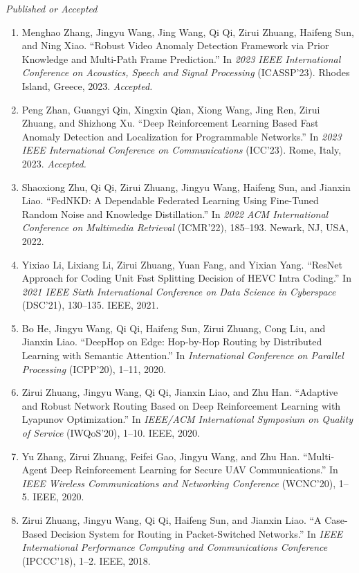 \documentclass[letterpaper,11pt]{article}
\newcommand{\contentlength}{5.25in} %
\begin{document}
\begin{tcolorbox}[flush right,breakable,colback=white,colframe=white,width=\contentlength]
		\textit{Published or Accepted}
		\begin{enumerate}[itemsep=0mm]
			\item Menghao Zhang, Jingyu Wang, Jing Wang, Qi Qi, Zirui Zhuang, Haifeng Sun, and Ning Xiao. “Robust Video Anomaly Detection Framework via Prior Knowledge and Multi-Path Frame Prediction.” In \textit{2023 IEEE International Conference on Acoustics, Speech and Signal Processing} (ICASSP’23). Rhodes Island, Greece, 2023. \textit{Accepted.}
			\item Peng Zhan, Guangyi Qin, Xingxin Qian, Xiong Wang, Jing Ren, Zirui Zhuang, and Shizhong Xu. “Deep Reinforcement Learning Based Fast Anomaly Detection and Localization for Programmable Networks.” In \textit{2023 IEEE International Conference on Communications} (ICC’23). Rome, Italy, 2023. \textit{Accepted.}
			\item Shaoxiong Zhu, Qi Qi, Zirui Zhuang, Jingyu Wang, Haifeng Sun, and Jianxin Liao. “FedNKD: A Dependable Federated Learning Using Fine-Tuned Random Noise and Knowledge Distillation.” In \textit{2022 ACM International Conference on Multimedia Retrieval} (ICMR'22), 185–193. Newark, NJ, USA, 2022.
			\item Yixiao Li, Lixiang Li, Zirui Zhuang, Yuan Fang, and Yixian Yang. “ResNet Approach for Coding Unit Fast Splitting Decision of HEVC Intra Coding.” In \textit{2021 IEEE Sixth International Conference on Data Science in Cyberspace} (DSC'21), 130–135. IEEE, 2021.
			\item Bo He, Jingyu Wang, Qi Qi, Haifeng Sun, Zirui Zhuang, Cong Liu, and Jianxin Liao. “DeepHop on Edge: Hop-by-Hop Routing by Distributed Learning with Semantic Attention.” In \textit{International Conference on Parallel Processing} (ICPP'20), 1–11, 2020.
			\item Zirui Zhuang, Jingyu Wang, Qi Qi, Jianxin Liao, and Zhu Han. “Adaptive and Robust Network Routing Based on Deep Reinforcement Learning with Lyapunov Optimization.” In \textit{IEEE/ACM International Symposium on Quality of Service} (IWQoS'20), 1–10. IEEE, 2020.
			\item Yu Zhang, Zirui Zhuang, Feifei Gao, Jingyu Wang, and Zhu Han. “Multi-Agent Deep Reinforcement Learning for Secure UAV Communications.” In \textit{IEEE Wireless Communications and Networking Conference} (WCNC'20), 1–5. IEEE, 2020.
			\item Zirui Zhuang, Jingyu Wang, Qi Qi, Haifeng Sun, and Jianxin Liao. “A Case-Based Decision System for Routing in Packet-Switched Networks.” In \textit{IEEE International Performance Computing and Communications Conference} (IPCCC'18), 1–2. IEEE, 2018.

\end{enumerate}
\end{tcolorbox}
\end{document}
